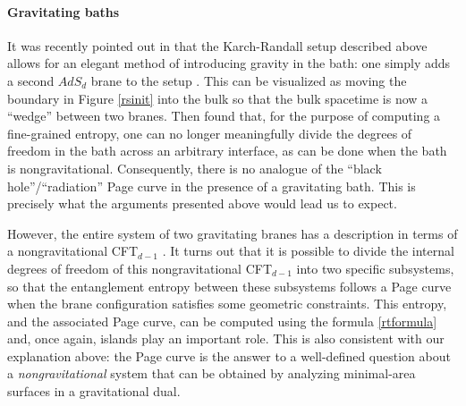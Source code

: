 \documentclass[12pt]{article}
\begin{document}
\paragraph{\bf Gravitating baths \\}
It was recently pointed out in \cite{Geng:2020fxl} that the Karch-Randall setup described above allows for an elegant method of introducing gravity in the bath: one simply adds a second $AdS_{d}$ brane to the setup \cite{Kogan:2000vb}. This can be visualized as moving the boundary in Figure \ref{rsinit} into the bulk so that the bulk spacetime is now a ``wedge'' between two branes.   Then \cite{Geng:2020fxl} found that, for the purpose
of computing a fine-grained entropy, one can no longer meaningfully divide the degrees of freedom in the bath across an arbitrary interface,  as can be done when the bath is nongravitational.   Consequently, there is no analogue of the ``black hole''/``radiation'' Page curve in the presence of a gravitating bath. This is precisely what the arguments presented above would lead us to expect.

However, the entire system of two gravitating branes has a description in terms of a nongravitational CFT$_{d-1}$ \cite{Akal:2020wfl}. It turns out that it is possible to divide the internal degrees of freedom of this nongravitational CFT$_{d-1}$  into two specific subsystems, so that the entanglement entropy between these subsystems follows a Page curve when the brane configuration satisfies some geometric constraints. This entropy, and the associated Page curve, can be computed using the formula \eqref{rtformula} and, once again, islands play an important role. This is also consistent with our explanation above:  the Page curve is the answer to a well-defined
question about a {\em nongravitational} system that can be obtained by analyzing  minimal-area surfaces in a gravitational dual.
\end{document}
